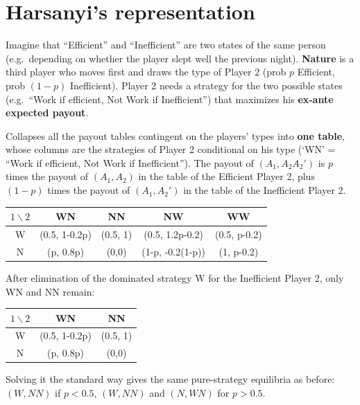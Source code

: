 \documentclass[11pt,a4paper,openany]{book}
\begin{document}
\section{Harsanyi's representation}

\begin{rembox}[title=Harsanyi's idea]
Imagine that ``Efficient'' and ``Inefficient'' are two states of the same person (e.g.\
depending on whether the player slept well the previous night). \textbf{Nature} is a third
player who moves first and draws the type of Player 2 (prob $p$ Efficient, prob $(1-p)$
Inefficient). Player 2 needs a strategy for the two possible states (e.g.\ ``Work if
efficient, Not Work if Inefficient'') that maximizes his \textbf{ex-ante expected payout}.
\end{rembox}

\begin{defnbox}[title=Harsanyi representation]
Collapses all the payout tables contingent on the players' types into \textbf{one table},
whose columns are the strategies of Player 2 conditional on his type (`WN' = ``Work if
efficient, Not Work if Inefficient''). The payout of $(A_1, A_2A_2')$ is $p$ times the payout
of $(A_1, A_2)$ in the table of the Efficient Player 2, plus $(1-p)$ times the payout of
$(A_1, A_2')$ in the table of the Inefficient Player 2.
\end{defnbox}

\begin{exbox}[title=Public good game]
\begin{center}
\small
\begin{tabular}{c|cccc}
$1 \backslash 2$ & WN & NN & NW & WW \\ \hline
W & (0.5, 1-0.2p) & (0.5, 1) & (0.5, 1.2p-0.2) & (0.5, p-0.2) \\
N & (p, 0.8p) & (0,0) & (1-p, -0.2(1-p)) & (1, p-0.2)
\end{tabular}
\end{center}
After elimination of the dominated strategy W for the Inefficient Player 2, only WN and NN
remain:
\begin{center}
\begin{tabular}{c|cc}
$1 \backslash 2$ & WN & NN \\ \hline
W & (0.5, 1-0.2p) & (0.5, 1) \\
N & (p, 0.8p) & (0,0)
\end{tabular}
\end{center}
Solving it the standard way gives the same pure-strategy equilibria as before: $(W, NN)$ if
$p < 0.5$, $(W, NN)$ and $(N, WN)$ for $p > 0.5$.
\end{exbox}
\end{document}
